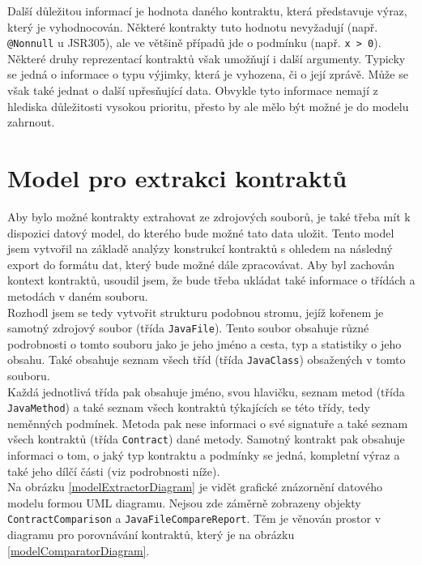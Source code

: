 		Další důležitou informací je hodnota daného kontraktu, která představuje výraz, který je vyhodnocován. Některé kontrakty tuto hodnotu nevyžadují (např. \texttt{@Nonnull} u JSR305), ale ve většině případů jde o podmínku (např. \texttt{x > 0}). Některé druhy reprezentací kontraktů však umožňují i další argumenty. Typicky se jedná o informace o typu výjimky, která je vyhozena, či o její zprávě. Může se však také jednat o další upřesňující data. Obvykle tyto informace nemají z hlediska důležitosti vysokou prioritu, přesto by ale mělo být možné je do modelu zahrnout.
		
	
	\section{Model pro extrakci kontraktů}
			Aby bylo možné kontrakty extrahovat ze zdrojových souborů, je také třeba mít k dispozici datový model, do kterého bude možné tato data uložit. Tento model jsem vytvořil na základě analýzy konstrukcí kontraktů s ohledem na následný export do formátu dat, který bude možné dále zpracovávat. Aby byl zachován kontext kontraktů, usoudil jsem, že bude třeba ukládat také informace o třídách a metodách v daném souboru.\\
			
			Rozhodl jsem se tedy vytvořit strukturu podobnou stromu, jejíž kořenem je samotný zdrojový soubor (třída \texttt{JavaFile}). Tento soubor obsahuje různé podrobnosti o tomto souboru jako je jeho jméno a cesta, typ a statistiky o jeho obsahu. Také obsahuje seznam všech tříd (třída \texttt{JavaClass}) obsažených v tomto souboru.\\
			
			Každá jednotlivá třída pak obsahuje jméno, svou hlavičku, seznam metod (třída \texttt{JavaMethod}) a také seznam všech kontraktů týkajících se této třídy, tedy neměnných podmínek. Metoda pak nese informaci o své signatuře a také seznam všech kontraktů (třída \texttt{Contract}) dané metody. Samotný kontrakt pak obsahuje informaci o tom, o jaký typ kontraktu a podmínky se jedná, kompletní výraz a také jeho dílčí části (viz podrobnosti níže).\\
			
			Na obrázku \ref{modelExtractorDiagram} je vidět grafické znázornění datového modelu formou UML diagramu. Nejsou zde záměrně zobrazeny objekty \texttt{ContractComparison} a \texttt{JavaFileCompareReport}. Těm je věnován prostor v diagramu pro porovnávání kontraktů, který je na obrázku \ref{modelComparatorDiagram}.\\ 
							
